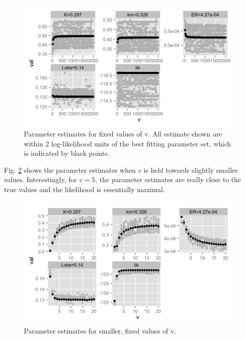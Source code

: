 \documentclass[12pt,reqno,final,pdftex]{amsart}\usepackage[]{graphicx}\usepackage[]{color}
\newenvironment{knitrout}{}{} %
\theoremstyle{plain}
\numberwithin{equation}{part}
\begin{document}
\begin{knitrout}\scriptsize
{}\color{fgcolor}\begin{figure}

\includegraphics[width=\linewidth]{figure/growth-reprod-2-1} \hfill{}

\caption[Parameter estimates for fixed values of v]{Parameter estimates for fixed values of v. All estimate shown are within 2 log-likelihood units of the best fitting parameter set, which is indicated by black points.}\label{fig:growth-reprod-2}
\end{figure}


\end{knitrout}

Fig. \ref{fig:growth-reprod-3} shows the parameter estimates when $v$ is held towards slightly smaller values.
Interestingly, for $v=5$, the parameter estimates are really close to the true values and the likelihood is essentially maximal.

\begin{knitrout}\scriptsize
{}\color{fgcolor}\begin{figure}

\includegraphics[width=\linewidth]{figure/growth-reprod-3-1} \hfill{}

\caption[Parameter estimates for smaller, fixed values of v]{Parameter estimates for smaller, fixed values of v.}\label{fig:growth-reprod-3}
\end{figure}


\end{knitrout}
\end{document}
